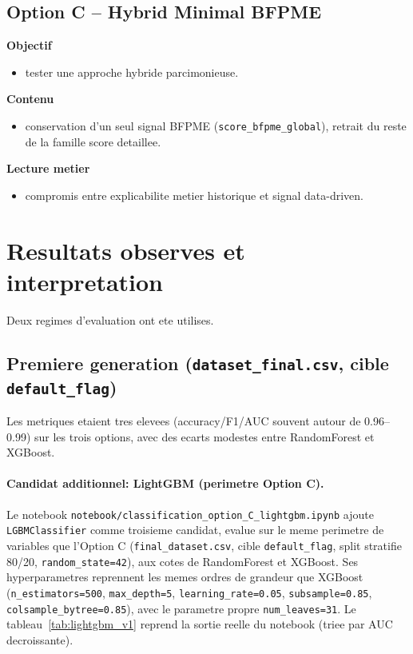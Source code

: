 \documentclass[11pt,a4paper]{article}
\begin{document}
\subsection{Option C -- Hybrid Minimal BFPME}
\textbf{Objectif}
\begin{itemize}[leftmargin=1.2cm]
  \item tester une approche hybride parcimonieuse.
\end{itemize}
\textbf{Contenu}
\begin{itemize}[leftmargin=1.2cm]
  \item conservation d'un seul signal BFPME (\texttt{score\_bfpme\_global}), retrait du reste de la famille score detaillee.
\end{itemize}
\textbf{Lecture metier}
\begin{itemize}[leftmargin=1.2cm]
  \item compromis entre explicabilite metier historique et signal data-driven.
\end{itemize}

\section{Resultats observes et interpretation}

Deux regimes d'evaluation ont ete utilises.

\subsection{Premiere generation (\texttt{dataset\_final.csv}, cible \texttt{default\_flag})}

Les metriques etaient tres elevees (accuracy/F1/AUC souvent autour de 0.96--0.99) sur les trois options, avec des ecarts modestes entre RandomForest et XGBoost.

\paragraph{Candidat additionnel: LightGBM (perimetre Option C).}
Le notebook \texttt{notebook/classification\_option\_C\_lightgbm.ipynb} ajoute \texttt{LGBMClassifier}
comme troisieme candidat, evalue sur le meme perimetre de variables que l'Option C
(\texttt{final\_dataset.csv}, cible \texttt{default\_flag}, split stratifie 80/20,
\texttt{random\_state=42}), aux cotes de RandomForest et XGBoost. Ses hyperparametres reprennent
les memes ordres de grandeur que XGBoost (\texttt{n\_estimators=500}, \texttt{max\_depth=5},
\texttt{learning\_rate=0.05}, \texttt{subsample=0.85}, \texttt{colsample\_bytree=0.85}), avec le
parametre propre \texttt{num\_leaves=31}. Le tableau~\ref{tab:lightgbm_v1} reprend la sortie reelle
du notebook (triee par AUC decroissante).
\end{document}
